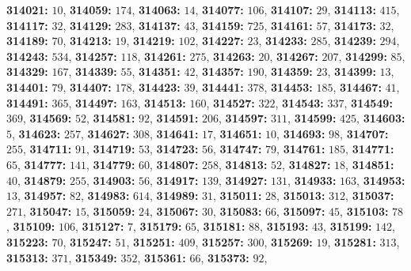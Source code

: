 \textsf{\bfseries 314021:} $10$, \textsf{\bfseries 314059:} $174$, \textsf{\bfseries 314063:} $14$, \textsf{\bfseries 314077:} $106$, \textsf{\bfseries 314107:} $29$, \textsf{\bfseries 314113:} $415$, \textsf{\bfseries 314117:} $32$, \textsf{\bfseries 314129:} $283$, \textsf{\bfseries 314137:} $43$, \textsf{\bfseries 314159:} $725$, \textsf{\bfseries 314161:} $57$, \textsf{\bfseries 314173:} $32$, \textsf{\bfseries 314189:} $70$, \textsf{\bfseries 314213:} $19$, \textsf{\bfseries 314219:} $102$, \textsf{\bfseries 314227:} $23$, \textsf{\bfseries 314233:} $285$, \textsf{\bfseries 314239:} $294$, \textsf{\bfseries 314243:} $534$, \textsf{\bfseries 314257:} $118$, \textsf{\bfseries 314261:} $275$, \textsf{\bfseries 314263:} $20$, \textsf{\bfseries 314267:} $207$, \textsf{\bfseries 314299:} $85$, \textsf{\bfseries 314329:} $167$, \textsf{\bfseries 314339:} $55$, \textsf{\bfseries 314351:} $42$, \textsf{\bfseries 314357:} $190$, \textsf{\bfseries 314359:} $23$, \textsf{\bfseries 314399:} $13$, \textsf{\bfseries 314401:} $79$, \textsf{\bfseries 314407:} $178$, \textsf{\bfseries 314423:} $39$, \textsf{\bfseries 314441:} $378$, \textsf{\bfseries 314453:} $185$, \textsf{\bfseries 314467:} $41$, \textsf{\bfseries 314491:} $365$, \textsf{\bfseries 314497:} $163$, \textsf{\bfseries 314513:} $160$, \textsf{\bfseries 314527:} $322$, \textsf{\bfseries 314543:} $337$, \textsf{\bfseries 314549:} $369$, \textsf{\bfseries 314569:} $52$, \textsf{\bfseries 314581:} $92$, \textsf{\bfseries 314591:} $206$, \textsf{\bfseries 314597:} $311$, \textsf{\bfseries 314599:} $425$, \textsf{\bfseries 314603:} $5$, \textsf{\bfseries 314623:} $257$, \textsf{\bfseries 314627:} $308$, \textsf{\bfseries 314641:} $17$, \textsf{\bfseries 314651:} $10$, \textsf{\bfseries 314693:} $98$, \textsf{\bfseries 314707:} $255$, \textsf{\bfseries 314711:} $91$, \textsf{\bfseries 314719:} $53$, \textsf{\bfseries 314723:} $56$, \textsf{\bfseries 314747:} $79$, \textsf{\bfseries 314761:} $185$, \textsf{\bfseries 314771:} $65$, \textsf{\bfseries 314777:} $141$, \textsf{\bfseries 314779:} $60$, \textsf{\bfseries 314807:} $258$, \textsf{\bfseries 314813:} $52$, \textsf{\bfseries 314827:} $18$, \textsf{\bfseries 314851:} $40$, \textsf{\bfseries 314879:} $255$, \textsf{\bfseries 314903:} $56$, \textsf{\bfseries 314917:} $139$, \textsf{\bfseries 314927:} $131$, \textsf{\bfseries 314933:} $163$, \textsf{\bfseries 314953:} $13$, \textsf{\bfseries 314957:} $82$, \textsf{\bfseries 314983:} $614$, \textsf{\bfseries 314989:} $31$, \textsf{\bfseries 315011:} $28$, \textsf{\bfseries 315013:} $312$, \textsf{\bfseries 315037:} $271$, \textsf{\bfseries 315047:} $15$, \textsf{\bfseries 315059:} $24$, \textsf{\bfseries 315067:} $30$, \textsf{\bfseries 315083:} $66$, \textsf{\bfseries 315097:} $45$, \textsf{\bfseries 315103:} $78$, \textsf{\bfseries 315109:} $106$, \textsf{\bfseries 315127:} $7$, \textsf{\bfseries 315179:} $65$, \textsf{\bfseries 315181:} $88$, \textsf{\bfseries 315193:} $43$, \textsf{\bfseries 315199:} $142$, \textsf{\bfseries 315223:} $70$, \textsf{\bfseries 315247:} $51$, \textsf{\bfseries 315251:} $409$, \textsf{\bfseries 315257:} $300$, \textsf{\bfseries 315269:} $19$, \textsf{\bfseries 315281:} $313$, \textsf{\bfseries 315313:} $371$, \textsf{\bfseries 315349:} $352$, \textsf{\bfseries 315361:} $66$, \textsf{\bfseries 315373:} $92$, 
